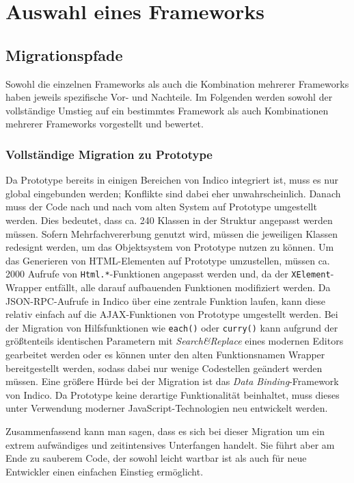 \chapter{Auswahl eines Frameworks}

\section{Migrationspfade}
Sowohl die einzelnen Frameworks als auch die Kombination mehrerer Frameworks haben jeweils
spezifische Vor- und Nachteile. Im Folgenden werden sowohl der vollständige Umstieg auf ein
bestimmtes Framework als auch Kombinationen mehrerer Frameworks vorgestellt und bewertet.

\subsection{Vollständige Migration zu Prototype}
Da Prototype bereits in einigen Bereichen von Indico integriert ist, muss es nur global
eingebunden werden; Konflikte sind dabei eher unwahrscheinlich. Danach muss der Code nach und nach
vom alten System auf Prototype umgestellt werden. Dies bedeutet, dass ca. 240 Klassen in der
Struktur angepasst werden müssen. Sofern Mehrfachvererbung genutzt wird, müssen die jeweiligen
Klassen redesignt werden, um das Objektsystem von Prototype nutzen zu können.
Um das Generieren von HTML-Elementen auf Prototype
umzustellen, müssen ca. 2000 Aufrufe von \lstinline{Html.*}-Funktionen angepasst werden und, da
der \lstinline{XElement}-Wrapper entfällt, alle darauf aufbauenden Funktionen modifiziert werden. Da
JSON-RPC-Aufrufe in Indico über eine zentrale Funktion laufen, kann diese relativ einfach auf die
AJAX-Funktionen von Prototype umgestellt werden. Bei der Migration von Hilfsfunktionen wie
\lstinline{each()} oder \lstinline{curry()} kann aufgrund der größtenteils identischen Parametern
mit \emph{Search\&Replace} eines modernen Editors gearbeitet werden oder es können unter den alten
Funktionsnamen Wrapper bereitgestellt werden, sodass dabei nur wenige Codestellen geändert werden
müssen. Eine größere Hürde bei der Migration ist das \emph{Data Binding}-Framework von Indico. Da
Prototype keine derartige Funktionalität beinhaltet, muss dieses unter Verwendung moderner
JavaScript-Technologien neu entwickelt werden.

Zusammenfassend kann man sagen, dass es sich bei dieser Migration um ein extrem aufwändiges und
zeitintensives Unterfangen handelt. Sie führt aber am Ende zu sauberem Code, der sowohl leicht
wartbar ist als auch für neue Entwickler einen einfachen Einstieg ermöglicht.


